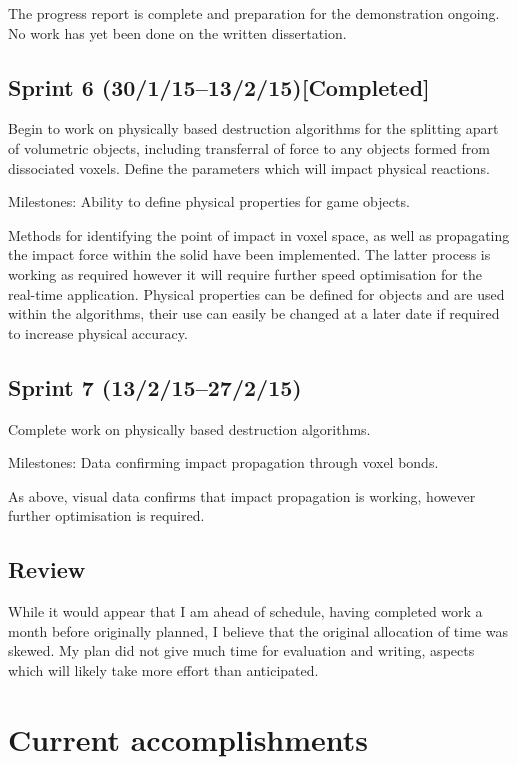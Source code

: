 \documentclass[a4 paper,12pt]{article}
\begin{document}
The progress report is complete and preparation for the demonstration ongoing. No work has yet been done on the written dissertation.


\subsection*{Sprint 6 (30/1/15--13/2/15)[Completed]}

{\it{Begin to work on physically based destruction algorithms for the splitting apart of volumetric objects, including transferral of force to any objects formed from dissociated voxels. Define the parameters which will impact physical reactions.

Milestones: Ability to define physical properties for game objects.}}

Methods for identifying the point of impact in voxel space, as well as propagating the impact force within the solid have been implemented. The latter process is working as required however it will require further speed optimisation for the real-time application. Physical properties can be defined for objects and are used within the algorithms, their use can easily be changed at a later date if required to increase physical accuracy.


\subsection*{Sprint 7 (13/2/15--27/2/15)}

{\it{Complete work on physically based destruction algorithms.

Milestones: Data confirming impact propagation through voxel bonds.}}

As above, visual data confirms that impact propagation is working, however further optimisation is required.


\subsection*{Review}

While it would appear that I am ahead of schedule, having completed work a month before originally planned, I believe that the original allocation of time was skewed. My plan did not give much time for evaluation and writing, aspects which will likely take more effort than anticipated.


\newpage

\section{Current accomplishments}
\end{document}

